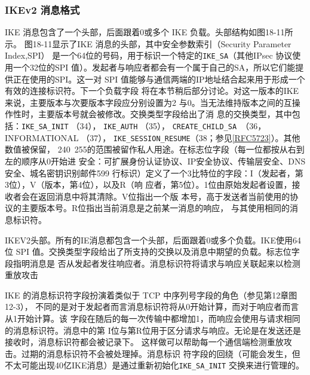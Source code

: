 \subsubsection{IKEv2 消息格式}
IKE 消息包含了一个头部，后面跟着0或多个 IKE 负载。头部结构如图18-11所示。
图18-11显示了IKE 消息的头部，其中安全参数索引（Security Parameter Index,SPI）
是一个64位的号码，用于标识一个特定的\verb|IKE_SA|（其他IPsec 协议使用一个32位的SPI
值）。发起者与响应者都会有一个属于自己的SA，所以它们能提供正在使用的SPI。这一对
SPI 值能够与通信两端的IP地址结合起来用于形成一个有效的连接标识符。下一个负载字段
将在本节稍后部分讨论。对这一版本的IKE来说，主要版本与次要版本字段应分别设置为2
与0。当无法维持版本之间的互操作性时，主要版本号就会被修改。交换类型字段给出了消
息的交换类型，其中包括：\verb|IKE_SA_INIT| （34）， \verb|IKE_AUTH| （35）， \verb|CREATE_CHILD_SA |（36，
INFORMATIONAL （37）， \verb|IKE_SESSION_RESUME|（38；参见\href{https://www.rfc-editor.org/rfc/rfc5723}{[RFC5723]}）。其他数值被保留，
240~255的范围被留作私人用途。在标志位字段（每一位都按从右到左的顺序从0开始进
安全：可扩展身份认证协议、IP安全协议、传输层安全、DNS 安全、城名密钥识别邮件599
行标识）定义了一个3比特位的字段：I（发起者，第3位），V（版本，第4位），以及R（响
应者，第5位）。1位由原始发起者设置，接收者会在返回消息中将其清除。V位指出一个版
本号，高于发送者当前使用的协议的主要版本号。R位指出当前消息是之前某一消息的响应，
与其使用相同的消息标识符。

IKEV2头部。所有的IE消息都包含一个头部，后面跟着0或多个负载。IKE使用64位
SPI 值。交换类型字段给出了所支持的交换以及消息中期望的负载。标志位字段指明消息是
否从发起者发往响应者。消息标识符将请求与响应关联起来以检测重放攻击

IKE 的消息标识符字段扮演着类似于 TCP 中序列号字段的角色（参见第12章图 12-3），
不同的是对于发起者而言消息标识符将从0开始计算，而对于响应者而言从1开始计算。该
字段在随后的每一次传输中都增加1，而响应会使用与请求相同的消息标识符。消息中的第
I位与第R位用于区分请求与响应。无论是在发送还是接收时，消息标识符都会被记录下。
这样做可以帮助每一个通信端检测重放攻击。过期的消息标识符不会被处理掉。消息标识
符字段的回绕（可能会发生，但不太可能出现40亿IKE消息）是通过重新初始化\verb|IKE_SA_INIT|
交换来进行管理的。

